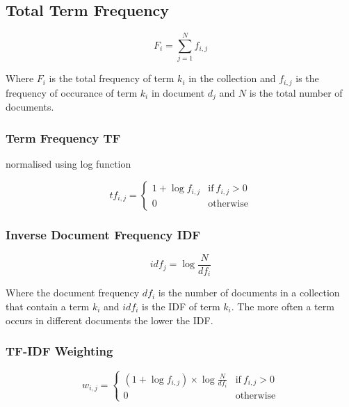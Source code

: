 \subsection*{Total Term Frequency}

\begin{equation}
  F_i = \sum_{j=1}^{N}f_{i,j}
  \label{eq:Fi}
\end{equation}

Where $F_i$ is the total frequency of term $k_i$ in the collection and $f_{i,j}$ is the frequency of occurance of term $k_i$ in document $d_j$ and $N$ is the total number of documents.

\subsubsection*{Term Frequency TF}

normalised using log function

\begin{equation}
  tf_{i,j}=
  \begin{cases}
  1+\log f_{i,j} & \text{if} \ f_{i,j} > 0\\
  0 & \text{otherwise}
  \end{cases}
  \label{eq:tfij}
\end{equation}

\subsubsection*{Inverse Document Frequency IDF}

\begin{equation}
  idf_j = \log \frac{N}{df_i}
  \label{eq:idfj}
\end{equation}

Where the document frequency $df_i$ is the number of documents in a collection that contain a term $k_i$ and $idf_i$ is the IDF of term $k_i$. The more often a term occurs in different documents the lower the IDF.

\subsubsection*{TF-IDF Weighting}

\begin{equation}
  w_{i,j} =
  \begin{cases}
  (1+\log f_{i,j})\times \log\frac{N}{df_i} & \text{if} \ f_{i,j} > 0 \\
  0 & \text{otherwise}
  \end{cases}
  \label{eq:wij}
\end{equation}

